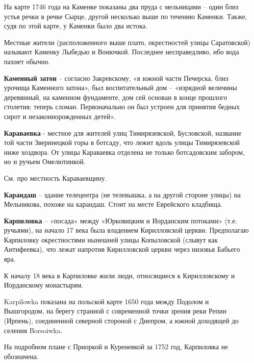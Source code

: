 На карте 1746 года на Каменке показаны два пруда с мельницами – один близ устья речки в речке Сырце, другой несколько выше по течению Каменки. Также, судя по этой карте, у Каменки было два истока.

Местные жители (расположенного выше плато, окрестностей улицы Саратовской) называют Каменку Лыбедью и Вонючкой. Последнее несправедливо, ибо вода пахнет обычно.\\

\medskip

\textbf{Каменный затон} – согласно Закревскому, «в южной части Печерска, близ урочища Каменного затона», был воспитательный дом – «изрядной величины деревянный, на каменном фундаменте, дом сей основан в конце прошлого столетия; теперь сломан. Первоначально он был устроен для принятия бедных сирот и незаконнорожденных детей».\\

\medskip

\textbf{Караваевка} - местное для жителей улиц Тимирязевской, Бусловской, название той части Зверинецкой горы в ботсаду, что лежит вдоль улицы Тимирязевской ниже хоздвора. От улицы Караваевка отделена не только ботсадовским забором, но и ручьем Омелютинкой.

См. про местность Караваевщину.\\ 

\medskip


\textbf{Карандаш} – здание телецентра (не телевышка, а на другой стороне улицы) на Мельникова, похоже на карандаш. Стоит на месте Еврейского кладбища.\\

\medskip

\textbf{Карпиловка} – «посада» между «Юрковицким и Иорданским потоками» (т.е. ручьями), на начало 17 века была владением Кирилловской церкви. Предполагаю Карпиловку окрестностями нынешней улицы Копыловской (слывут как Антифеевка), что лежат напротив Кирилловской церкви через низовья Бабьего яра.

К началу 18 века в Карпиловке жили люди, относящиеся к Кирилловскому и Иорданскому монастырям.

Karpilowka показана на польской карте 1650 года между Подолом и Вышгородом, на берегу странной с современной точки зрения реки Репин (Ирпень), соединенной северной стороной с Днепром, а южной доходящей до селения Borsoiwka. 

На подробном плане с Приоркой и Куреневкой за 1752 год, Карпиловка не обозначена.

